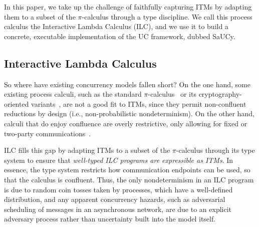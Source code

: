 In this paper, we take up the challenge of faithfully capturing ITMs by adapting
them to a subset of the $\pi$-calculus through a type discipline. We call this
process calculus the Interactive Lambda Calculus (ILC), and we use it to build a
concrete, executable implementation of the UC framework, dubbed SaUCy.


\subsection{Interactive Lambda Calculus}

So where have existing concurrency models fallen short? On the one hand, some
existing process calculi, such as the standard
$\pi$-calculus~\cite{milner1999communicating} or its cryptography-oriented
variants~\cite{abadi1999calculus, abadi2001mobile}, are not a good fit to ITMs,
since they permit non-confluent reductions by design (i.e., non-probabilistic
nondeterminism).
On the other hand, calculi that do enjoy confluence are overly restrictive, only
allowing for fixed or two-party
communications~\cite{kobayashi1999linearity,bohl2016symbolic,fowler2018session}.

ILC fills this gap by adapting ITMs to a subset of the $\pi$-calculus through its
type system to ensure that \emph{well-typed ILC programs are expressible as
  ITMs}. In essence, the type system restricts how communication endpoints can
be used, so that the calculus is confluent.  Thus, the only
nondeterminism in an ILC program is due to random coin tosses taken by
processes, which have a well-defined distribution, and any apparent concurrency
hazards, such as adversarial scheduling of messages in an asynchronous network,
are due to an explicit adversary process rather than uncertainty built into the
model itself.

